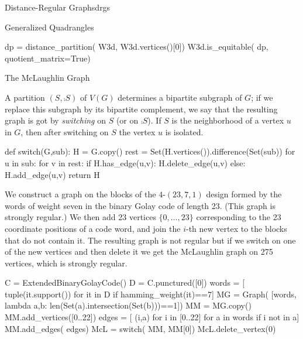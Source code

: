 \begin{chap}{Distance-Regular Graphs}{drgs}
\begin{sect}{Generalized Quadrangles}
%
\begin{sagecode}
\begin{sageinput}
dp = distance_partition( W3d, W3d.vertices()[0])
W3d.is_equitable( dp, quotient_matrix=True) 
\end{sageinput}
\begin{sageoutput}
[ 0 12  0]
[ 1  2  9]
[ 0  4  8]
\end{sageoutput}
\end{sagecode}
%
\end{sect}
%
\begin{sect}{The McLaughlin Graph}
%
\begin{para}
A partition $(S,\comp{S})$ of $V(G)$ determines a bipartite subgraph of $G$;
if we replace this subgraph by its bipartite complement, we say that the
resulting graph is got by \textsl{switching} on $S$ (or on $\comp{S}$).
If $S$ is the neighborhood of a vertex $u$ in $G$, then after switching
on $S$ the vertex $u$ is isolated.
\end{para}
%
\begin{sagecode}
\begin{sageinput}
def switch(G,sub):
    H = G.copy()
    rest = Set(H.vertices()).difference(Set(sub))
    for u in sub:
        for v in rest:
            if H.has_edge(u,v): H.delete_edge(u,v)
            else: H.add_edge(u,v)
    return H   
\end{sageinput}
\end{sagecode}
%
\begin{para}
We construct a graph on the blocks of the $4$-$(23,7,1)$ design
formed by the words of weight seven in the binary Golay code of length 23.
(This graph is strongly regular.)
We then add 23 vertices $\{0,\ldots,23\}$ corresponding to the 23 coordinate 
positions of a code word, and join the $i$-th new vertex to the blocks
that do not contain it. The resulting graph is not regular but if we switch on
one of the new vertices and then delete it we get the McLaughlin graph
on 275 vertices, which is strongly regular.
\end{para}
%
\begin{sagecode}
\begin{sageinput}
C = ExtendedBinaryGolayCode()
D = C.punctured([0])
words = [ tuple(it.support()) for it in D if hamming_weight(it)==7]
MG = Graph( [words, lambda a,b: len(Set(a).intersection(Set(b)))==1])
MM = MG.copy()
MM.add_vertices([0..22])
edges = [ (i,a) for i in [0..22] for a in words if i not in a]
MM.add_edges( edges)
McL = switch( MM, MM[0])
McL.delete_vertex(0)
\end{sageinput}

\end{sagecode}
\end{sect}
\end{chap}
